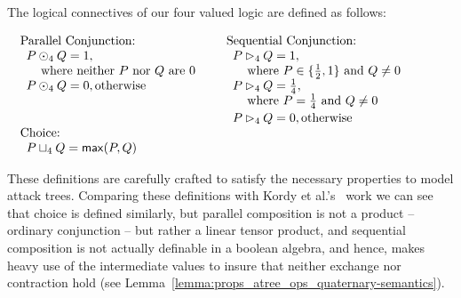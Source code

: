 \begin{definition}
  \label{def:logical-connectives}
  The logical connectives of our four valued logic are defined as
  follows:\vspace{-5px}  
    \begin{center}
      \begin{math}
        \setlength{\arraycolsep}{5px}
        \begin{array}{lll}
          \begin{array}{lll}
            \text{Parallel Conjunction:}\\
            \begin{array}{lll}
              P \odot_4 Q = 1,\\
              \,\,\,\,\,\,\,\text{where neither $P$ nor $Q$ are $0$}\\
              P \odot_4 Q = 0, \text{otherwise}\\
              \\\\[2px]
            \end{array}
            \\[14px]
          \end{array}
          &
          \begin{array}{lll}
            \text{Sequential Conjunction:}\\
            \begin{array}{lll}          
              P \rhd_4 Q = 1,\\
              \,\,\,\,\,\,\,\text{where } P \in \{\half, 1\} \text{ and } Q \neq 0\\
              P \rhd_4 Q = \forth, \\
              \,\,\,\,\,\,\,\text{where $P = \forth$ and $Q \neq 0$}\\[2px]         
              P \rhd_4 Q = 0, \text{otherwise}
            \end{array}
          \end{array}
          \\
          \begin{array}{lll}
            \text{Choice:}\\    
            \begin{array}{lll}
              P \sqcup_4 Q = \mathsf{max}(P,Q)
            \end{array}
          \end{array}
        \end{array}
      \end{math}
    \end{center}        
\end{definition}
These definitions are carefully crafted to satisfy the necessary
properties to model attack trees.  Comparing these definitions with
Kordy et al.'s~\cite{Kordy:2012} work we can see that choice is
defined similarly, but parallel composition is not a product --
ordinary conjunction -- but rather a linear tensor product, and
sequential composition is not actually definable in a boolean algebra,
and hence, makes heavy use of the intermediate values to insure that
neither exchange nor contraction hold (see
Lemma~\ref{lemma:props_atree_ops_quaternary-semantics}).

